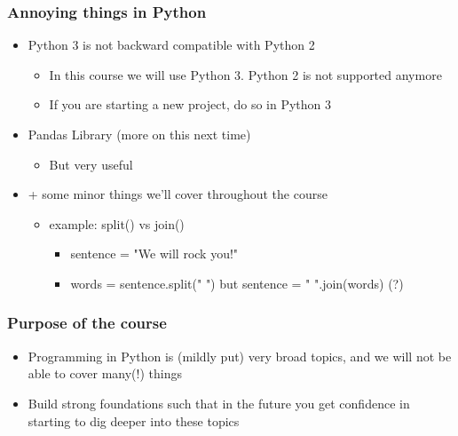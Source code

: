 \documentclass[compress, aspectratio=54]{beamer}
\begin{document}
\begin{frame}
\frametitle{Annoying things in Python}
\begin{itemize}

\item Python 3 is not backward compatible with Python 2
\begin{itemize}
\item In this course we will use Python 3. Python 2 is not supported anymore
\item If you are starting a new project, do so in Python 3
\end{itemize}

\item Pandas Library (more on this next time)
\begin{itemize}
\item But very useful 
\end{itemize}
\item + some minor things we'll cover throughout the course 
\begin{itemize}

\item example: split() vs join()
\begin{itemize}
\item sentence = "We will rock you!"

\item words = sentence.split(" ") but sentence = " ".join(words) (?)
\end{itemize}


\end{itemize}

\end{itemize}

\end{frame}
\begin{frame}
\frametitle{Purpose of the course}
\begin{itemize}

\item Programming in Python is (mildly put) very broad topics, and we will not be able to cover many(!) things
\item Build strong foundations such that in the future you get confidence in starting to dig deeper into these topics
 
\end{itemize}

\end{frame}

\end{document}
